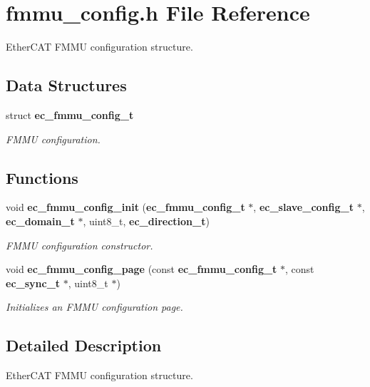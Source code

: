 \section{fmmu\-\_\-config.\-h File Reference}
\label{fmmu__config_8h}


Ether\-C\-A\-T F\-M\-M\-U configuration structure.  


\subsection*{Data Structures}
\begin{DoxyCompactItemize}
\item 
struct {\bf ec\-\_\-fmmu\-\_\-config\-\_\-t}
\begin{DoxyCompactList}\small\item\em F\-M\-M\-U configuration. \end{DoxyCompactList}\end{DoxyCompactItemize}
\subsection*{Functions}
\begin{DoxyCompactItemize}
\item 
void {\bf ec\-\_\-fmmu\-\_\-config\-\_\-init} ({\bf ec\-\_\-fmmu\-\_\-config\-\_\-t} $\ast$, {\bf ec\-\_\-slave\-\_\-config\-\_\-t} $\ast$, {\bf ec\-\_\-domain\-\_\-t} $\ast$, uint8\-\_\-t, {\bf ec\-\_\-direction\-\_\-t})
\begin{DoxyCompactList}\small\item\em F\-M\-M\-U configuration constructor. \end{DoxyCompactList}\item 
void {\bf ec\-\_\-fmmu\-\_\-config\-\_\-page} (const {\bf ec\-\_\-fmmu\-\_\-config\-\_\-t} $\ast$, const {\bf ec\-\_\-sync\-\_\-t} $\ast$, uint8\-\_\-t $\ast$)
\begin{DoxyCompactList}\small\item\em Initializes an F\-M\-M\-U configuration page. \end{DoxyCompactList}\end{DoxyCompactItemize}


\subsection{Detailed Description}
Ether\-C\-A\-T F\-M\-M\-U configuration structure. 

